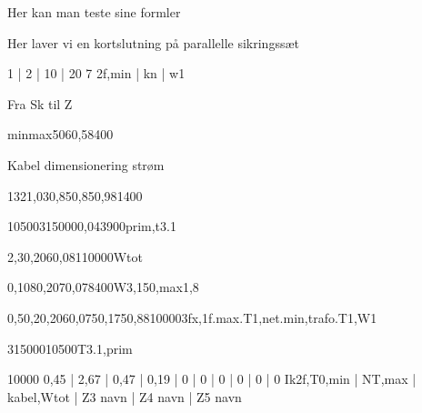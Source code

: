 \documentclass[a4paper,oneside,10pt,danish]{report}
\begin{document}
Her kan man teste sine formler

 
 Her laver vi en kortslutning på parallelle sikringssæt
	\begin{LV-Ik2f,parSikr-kA}
		{ 1 | 2 | 10 | 20 }
		{7}
		{2f,min | kn | w1}
	\end{LV-Ik2f,parSikr-kA} 
 
 
Fra Sk til Z
\begin{FraSkTilZ}{min}{max}{50}{6}{0,58}{400}
\end{FraSkTilZ}

Kabel dimensionering strøm
\begin{Iz,min}{132}{1,03}{0,85}{0,85}{0,98}{1}{400}
\end{Iz,min}

\begin{Ztrafo}{10500}{315000}{0,04}{3900}{prim,t3.1}
\end{Ztrafo}

\begin{Zkabel}{2,3}{0,206}{0,081}{10000}{Wtot}
\end{Zkabel}
\begin{Zkabel-max}{0,108}{0,207}{0,078}{400}{W3,150,max}{1,8}
\end{Zkabel-max}


\begin{ZtilIkHV}{0,5}{0,2}{0,206}{0,075}{0,175}{0,88}{10000}{3fx,1f.max.T1,net.min,trafo.T1,W1}
\end{ZtilIkHV}


\begin{TrafoFuldlast}{315000}{10500}{T3.1,prim}
\end{TrafoFuldlast}

\begin{HV-ZtilIk2f}{10000}{ 0,45 | 2,67 | 0,47 | 0,19 | 0 | 0 | 0 | 0 | 0 | 0 }{Ik2f,T0,min | NT,max | kabel,Wtot | Z3 navn | Z4 navn | Z5 navn}
\end{HV-ZtilIk2f}
\end{document}
